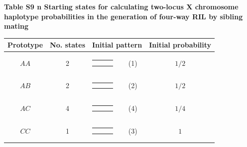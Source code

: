 \documentclass[9pt,letterpaper,twoside]{article}
\begin{document}
\newpage

\noindent \textbf{Table S9 {\color{white} n} Starting states for calculating
two-locus X chromosome haplotype probabilities in the generation of four-way RIL by
sibling mating}

\bigskip

{
\begin{center}
\begin{tabular}{ccrlc} \hline
Prototype & No. states & \multicolumn{2}{c}{Initial pattern} & Initial probability \\ \hline
$AA$ & 2 & 
{\renewcommand{\arraystretch}{0.3}
\renewcommand{\tabcolsep}{0.5mm}
\parbox[b][3mm][c]{12mm}{
\begin{tabular}{|p{2mm}|p{2mm}||p{2mm}|} \hline
$\bullet$ &           &           \\
$\bullet$ &           &           \\ \hline
\end{tabular}}}
& (1) & $1/2$ \\
$AB$ & 2 & 
{\renewcommand{\arraystretch}{0.3}
\renewcommand{\tabcolsep}{0.5mm}
\parbox[b][3mm][c]{12mm}{
\begin{tabular}{|p{2mm}|p{2mm}||p{2mm}|} \hline
$\bullet$ &           &           \\
          & $\bullet$ &           \\ \hline
\end{tabular}}}
& (2) & $1/2$ \\
$AC$ & 4 & 
{\renewcommand{\arraystretch}{0.3}
\renewcommand{\tabcolsep}{0.5mm}
\parbox[b][3mm][c]{12mm}{
\begin{tabular}{|p{2mm}|p{2mm}||p{2mm}|} \hline
$\bullet$ &           &           \\
          &           & $\bullet$ \\ \hline
\end{tabular}}}
& (4) & $1/4$ \\
$CC$ & 1 & 
{\renewcommand{\arraystretch}{0.3}
\renewcommand{\tabcolsep}{0.5mm}
\parbox[b][3mm][c]{12mm}{
\begin{tabular}{|p{2mm}|p{2mm}||p{2mm}|} \hline
          &           & $\bullet$ \\
          &           & $\bullet$ \\ \hline
\end{tabular}}}
& (3) & $1$ \\
\hline
\end{tabular}
\end{center}
}
\end{document}
